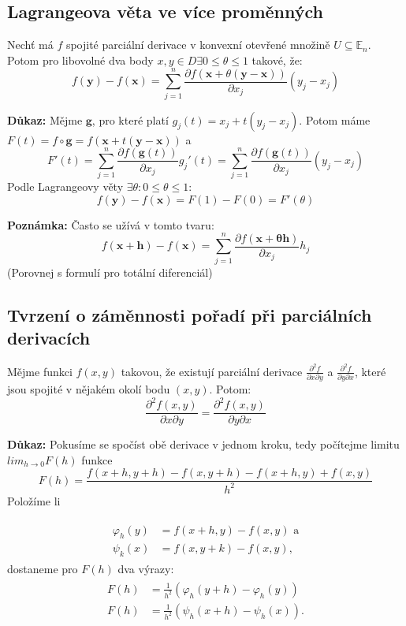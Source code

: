\documentclass[../main.tex]{subfiles}
\begin{document}
\subsection{Lagrangeova věta ve více proměnných}
\hspace{1.2mm}
\noindent
Nechť má $f$ spojité parciální derivace v konvexní otevřené množině $U \subseteq \mathbb{E}_{n}$.
Potom pro libovolné dva body $x,y \in D \exists 0 \leq \theta \leq 1$ takové, že:
\[ f(\mathbf{y}) - f(\mathbf{x}) =
\sum^{n}_{j=1} \frac{\partial f(\mathbf{x} + \theta (\mathbf{y}-\mathbf{x}))}{\partial x_j}(y_j - x_j) \]

\noindent
\textbf{Důkaz:}
Mějme $\mathbf{g}$, pro které platí $g_j(t) = x_j + t(y_j - x_j)$.
Potom máme $F(t) = f \circ \mathbf{g} = f(\mathbf{x} + t(\mathbf{y}-\mathbf{x}))$ a
\[ F'(t) = \sum^{n}_{j=1} \frac{\partial f(\mathbf{g}(t))}{\partial x_j}g_j'(t) =
\sum^{n}_{j=1} \frac{\partial f(\mathbf{g}(t))}{\partial x_j}(y_j - x_j)  \]
Podle Lagrangeovy věty $\exists \theta : 0 \leq \theta \leq 1$:
\[ f(\mathbf{y}) - f(\mathbf{x}) = F(1) - F(0) = F'(\theta) \]

\noindent
\textbf{Poznámka:}
Často se užívá v tomto tvaru:
\[ f(\mathbf{x} + \mathbf{h}) - f(\mathbf{x}) =
\sum^{n}_{j=1} \frac{\partial f(\mathbf{x + \theta \mathbf{h}})}{\partial x_j}h_j \]
(Porovnej s formulí pro totální diferenciál)

\subsection{Tvrzení o záměnnosti pořadí při parciálních derivacích}
\hspace{1.2mm}
\noindent
Mějme funkci $f(x,y)$ takovou, že existují parciální derivace
$\frac{\partial ^2 f}{\partial x \partial y}$ a $\frac{\partial ^2 f}{\partial y \partial x}$, které
jsou spojité v nějakém okolí bodu $(x,y)$. Potom:
\[ \frac{\partial ^2 f(x,y)}{\partial x \partial y} = \frac{\partial ^2 f(x,y)}{\partial y \partial x} \]

\noindent
\textbf{Důkaz:} Pokusíme se spočíst obě derivace v jednom kroku, tedy počítejme limitu $lim_{h\rightarrow 0} F(h)$ funkce
\[F(h) = \frac{f(x+h,y+h) - f(x,y+h) - f(x+h,y) + f(x,y)}{h^2}\]
Položíme li 

\begin{align*} 
\begin{split}
\varphi_h(y) & = f(x+h,y) - f(x,y)\text{ a}\\
\psi_k(x) & = f(x,y+k) - f(x,y),
\end{split}
\end{align*}
dostaneme pro $F(h)$ dva výrazy:
\begin{align*} 
\begin{split}
F(h) & = \frac{1}{h^2} (\varphi_h(y+h) - \varphi_h(y))\\
F(h) & = \frac{1}{h^2} (\psi_h(x+h)-\psi_h(x)).
\end{split}
\end{align*}
\end{document}
